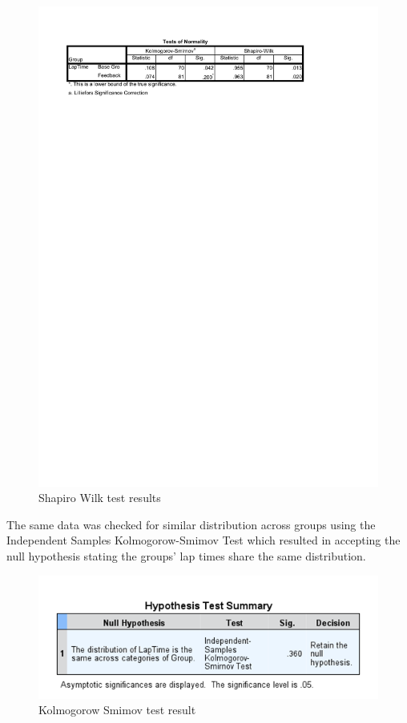 \begin{figure}[!htb]
	\centering
	\includegraphics[width=\textwidth]{charts/shapiroWilkResults.pdf}
	\caption[Shapiro Wilk]{Shapiro Wilk test results}
	\label{fig:chart-shapiroWilk}
\end{figure}

The same data was checked for similar distribution across groups using the Independent Samples Kolmogorow-Smimov Test which resulted in accepting the null hypothesis stating the groups' lap times share the same distribution.

\begin{figure}[!htb]
	\centering
	\includegraphics[width=\textwidth]{images/KolmogorowSmimov.png}
	\caption[Kolmogorow Smimov Test]{Kolmogorow Smimov test result}
	\label{fig:chart-KolmogorowSmimov}
\end{figure}

